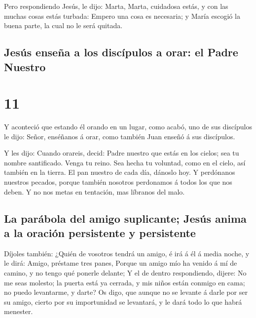  Pero respondiendo Jesús, le dijo: Marta, Marta,
cuidadosa estás, y con las muchas cosas estás turbada: 
Empero una cosa es necesaria; y María escogió la buena parte, la cual no
le será quitada.

\hypertarget{jesuxfas-enseuxf1a-a-los-discuxedpulos-a-orar-el-padre-nuestro}{%
\subsection{Jesús enseña a los discípulos a orar: el Padre
Nuestro}\label{jesuxfas-enseuxf1a-a-los-discuxedpulos-a-orar-el-padre-nuestro}}

\hypertarget{section-10}{%
\section{11}\label{section-10}}

 Y aconteció que estando él orando en un lugar, como
acabó, uno de sus discípulos le dijo: Señor, enséñanos á orar, como
también Juan enseñó á sus discípulos.

 Y les dijo: Cuando orareis, decid: Padre nuestro que
estás en los cielos; sea tu nombre santificado. Venga tu reino. Sea
hecha tu voluntad, como en el cielo, así también en la tierra.
 El pan nuestro de cada día, dánoslo hoy.  Y
perdónanos nuestros pecados, porque también nosotros perdonamos á todos
los que nos deben. Y no nos metas en tentación, mas líbranos del malo.

\hypertarget{la-paruxe1bola-del-amigo-suplicante-jesuxfas-anima-a-la-oraciuxf3n-persistente-y-persistente}{%
\subsection{La parábola del amigo suplicante; Jesús anima a la oración
persistente y
persistente}\label{la-paruxe1bola-del-amigo-suplicante-jesuxfas-anima-a-la-oraciuxf3n-persistente-y-persistente}}

 Díjoles también: ¿Quién de vosotros tendrá un amigo, é
irá á él á media noche, y le dirá: Amigo, préstame tres panes,
 Porque un amigo mío ha venido á mí de camino, y no tengo
qué ponerle delante;  Y el de dentro respondiendo, dijere:
No me seas molesto; la puerta está ya cerrada, y mis niños están conmigo
en cama; no puedo levantarme, y darte?  Os digo, que
aunque no se levante á darle por ser su amigo, cierto por su
importunidad se levantará, y le dará todo lo que habrá menester.

